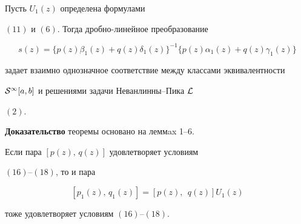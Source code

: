 \begin{thm}


Пусть $U_1(z)$ определена формулами


$(11)$ и $(6)$. Тогда дробно-линейное преобразование


\begin{equation}


s(z)= \{ p(z)\beta_1(z) +q(z)\delta_1(z)\}^{-1}


\{p(z)\alpha_1(z)+q(z)\gamma_1(z) \}


\end{equation}


задает взаимно однозначное соответствие между классами эквивалентности


${\cal S}^{\infty}[a,b]$ и решениями задачи Неванлинны--Пика $\cal {L}$


$(2)$.


\end{thm}





{\bf Доказательство} теоремы основано на леммax 1--6.





\begin{lem}


Если пара $[p(z),\,q(z)]$ удовлетворяет условиям


$(16)$--$(18)$, то и пара


\begin{equation}


[p_1(z),\,q_1(z)]=[p(z), \ \ q(z)]U_1(z)


\end{equation}


тоже удовлетворяет условиям $(16)$--$(18)$.


\end{lem}





